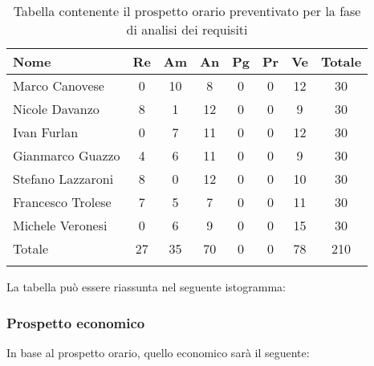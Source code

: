			\begin{longtable}{|l|c|c|c|c|c|c|c|}
				\hline
				\rowcolor{lighter-grayer}
				\textbf{Nome} & \textbf{Re} & \textbf{Am} & \textbf{An} & \textbf{Pg}  & \textbf{Pr}   & \textbf{Ve} & \textbf{Totale} \\
				\hline
				\endfirsthead
				
				\hline
				Marco Canovese & 0 & 10 & 8 & 0 & 0 & 12 & 30\\
				\hline
				\hline
				Nicole Davanzo & 8 & 1 & 12 & 0 & 0 & 9 & 30\\
				\hline
				\hline
				Ivan Furlan & 0 & 7 & 11 & 0 & 0 & 12 & 30\\
				\hline
				\hline
				Gianmarco Guazzo & 4 & 6 & 11 & 0 & 0 & 9 & 30\\
				\hline
				\hline
				Stefano Lazzaroni & 8 & 0 & 12 & 0 & 0 & 10 & 30\\
				\hline
				\hline
				Francesco Trolese & 7 & 5 & 7 & 0 & 0 & 11 & 30\\
				\hline
				\hline
				Michele Veronesi & 0 & 6 & 9 & 0 & 0 & 15 & 30\\
				\hline 
				\hline
				Totale & 27 & 35 & 70 & 0 & 0 & 78 & 210\\
				\hline 
				\caption{Tabella contenente il prospetto orario preventivato per la fase di analisi dei requisiti}
			\end{longtable}

		
			La tabella può essere riassunta nel seguente istogramma:
		
		
			\subsubsection{Prospetto economico}
			In base al prospetto orario, quello economico sarà il seguente: 
			
